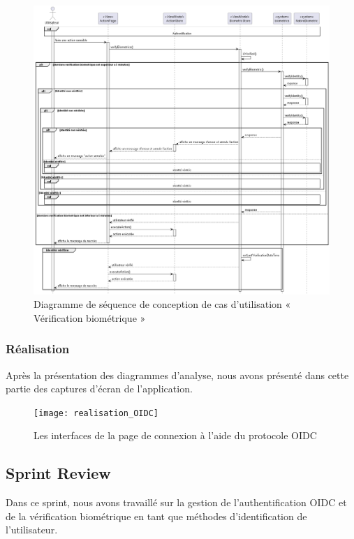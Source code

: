 \begin{figure}[H]
  \centering
  \includegraphics[width=1\textwidth]{out/diagrams/sprint5/sequence_verification_biometrique/sequence_verification_biometrique}
  \caption{Diagramme de séquence de conception de cas d'utilisation « Vérification biométrique »}
  \label{fig:sequence_conception_verification_biometrique}
\end{figure}

\subsubsection{Réalisation}

Après la présentation des diagrammes d'analyse, nous avons présenté dans cette partie des captures d'écran de l'application.

\begin{figure}[H]
  \centering
  \texttt{[image: realisation\_OIDC]}
  \caption{Les interfaces de la page de connexion à l'aide du protocole OIDC}
  \label{fig:realisation_OIDC}
\end{figure}

\subsection{Sprint Review}
Dans ce sprint, nous avons travaillé sur la gestion de l'authentification OIDC et de la vérification biométrique en tant que méthodes d'identification de l'utilisateur.
